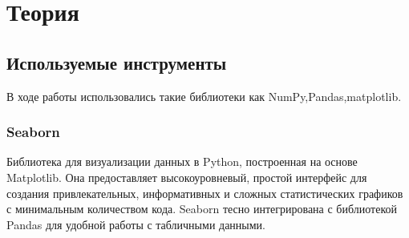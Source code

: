 \chapter{Теория}

\section{Используемые инструменты}
В ходе работы использовались такие библиотеки как NumPy,Pandas,matplotlib. \\

\subsection{Seaborn}
Библиотека для визуализации данных в Python, построенная на основе Matplotlib. Она предоставляет высокоуровневый, простой 
интерфейс для создания привлекательных, информативных и сложных статистических графиков с минимальным количеством кода. 
Seaborn тесно интегрирована с библиотекой Pandas для удобной работы с табличными данными.
\endinput